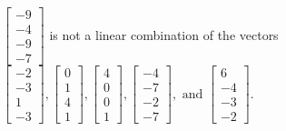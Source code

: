 \begin{exercise}
\begin{exerciseStatement}
  \end{exerciseStatement}
  \begin{exerciseAnswer}
   \(\left[\begin{array}{c}
-9 \\
-4 \\
-9 \\
-7
\end{array}\right]\) 
  	 is not  
	a linear combination of the vectors \(\left[\begin{array}{c}
-2 \\
-3 \\
1 \\
-3
\end{array}\right] , \left[\begin{array}{c}
0 \\
1 \\
4 \\
1
\end{array}\right] , \left[\begin{array}{c}
4 \\
0 \\
0 \\
1
\end{array}\right] , \left[\begin{array}{c}
-4 \\
-7 \\
-2 \\
-7
\end{array}\right] , \text{ and } \left[\begin{array}{c}
6 \\
-4 \\
-3 \\
-2
\end{array}\right]\).

	
  


  \end{exerciseAnswer}
\end{exercise}
